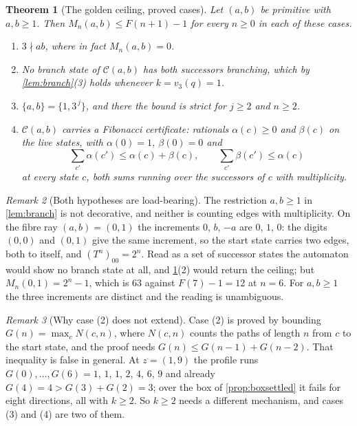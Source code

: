 \documentclass[11pt]{amsart}
\newtheorem{theorem}{Theorem}[section]
\theoremstyle{definition}
\theoremstyle{remark}
\newtheorem{remark}[theorem]{Remark}
\begin{document}
\begin{theorem}[The golden ceiling, proved cases]
\label{thm:ceilingproved}
Let $(a,b)$ be primitive with $a,b\ge 1$. Then $M_n(a,b)\le F(n+1)-1$ for every $n\ge 0$ in each of these cases.
\begin{enumerate}
\item $3\nmid ab$, where in fact $M_n(a,b)=0$.
\item No branch state of $\mathcal{C}(a,b)$ has both successors branching, which by \cref{lem:branch}(3) holds whenever $k=v_3(q)=1$.
\item $\{a,b\}=\{1,3^{\,j}\}$, and there the bound is strict for $j\ge 2$ and $n\ge 2$.
\item $\mathcal{C}(a,b)$ carries a \emph{Fibonacci certificate}: rationals $\alpha(c)\ge 0$ and $\beta(c)$ on the live states, with $\alpha(0)=1$, $\beta(0)=0$ and
\[
\sum_{c'}\alpha(c')\le\alpha(c)+\beta(c),
\qquad
\sum_{c'}\beta(c')\le\alpha(c)
\]
at every state $c$, both sums running over the successors of $c$ with multiplicity.
\end{enumerate}
\end{theorem}

\begin{remark}[Both hypotheses are load-bearing]
\label{rem:fibre}
The restriction $a,b\ge 1$ in \cref{lem:branch} is not decorative, and neither is counting edges with multiplicity. On the fibre ray $(a,b)=(0,1)$ the increments $0$, $b$, $-a$ are $0$, $1$, $0$: the digits $(0,0)$ and $(0,1)$ give the same increment, so the start state carries two edges, both to itself, and $(T^n)_{00}=2^n$. Read as a set of successor states the automaton would show no branch state at all, and \cref{thm:ceilingproved}(2) would return the ceiling; but $M_n(0,1)=2^n-1$, which is $63$ against $F(7)-1=12$ at $n=6$. For $a,b\ge 1$ the three increments are distinct and the reading is unambiguous.
\end{remark}

\begin{remark}[Why case (2) does not extend]
\label{rem:statemax}
Case (2) is proved by bounding $G(n)=\max_c N(c,n)$, where $N(c,n)$ counts the paths of length $n$ from $c$ to the start state, and the proof needs $G(n)\le G(n-1)+G(n-2)$. That inequality is false in general. At $z=(1,9)$ the profile runs $G(0),\dots,G(6)=1$, $1$, $1$, $2$, $4$, $6$, $9$ and already $G(4)=4>G(3)+G(2)=3$; over the box of \cref{prop:boxsettled} it fails for eight directions, all with $k\ge 2$. So $k\ge 2$ needs a different mechanism, and cases (3) and (4) are two of them.
\end{remark}
\end{document}
